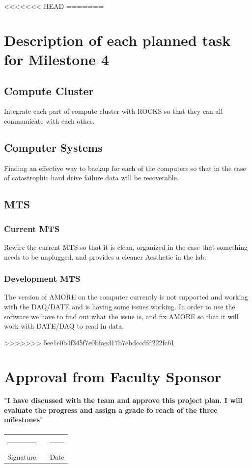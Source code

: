 \documentclass[12pt]{article}
\newcommand\tab[1][1cm]{\hspace*{#1}}
\newcommand{\doubleSignature}[2]{
	\begin{center}
		
	\end{center}
	\vspace{2cm}
	
	\noindent
	\begin{tabular}{lcl}
		\rule{7cm}{1pt} & \hspace{2cm} & \rule{3cm}{1pt} \\
		#1 & & #2
	\end{tabular}
	\vspace{1cm}
}
\begin{document}
<<<<<<< HEAD
=======
\section{Description of each planned task for Milestone 4}
\subsection{Compute Cluster}
\tab Integrate each part of compute cluster with ROCKS so that they can all communicate with each other.
\subsection{Computer Systems}
\tab Finding an effective way to backup for each of the computers so that in the case of catastrophic hard drive failure data will be recoverable. 
\subsection{MTS}
\subsubsection{Current MTS}
\tab Rewire the current MTS so that it is clean, organized in the case that something needs to be unplugged, and provides a cleaner Aesthetic in the lab. 
\subsubsection{Development MTS}
\tab The version of AMORE on the computer currently is not supported and working with the DAQ/DATE and is having some issues working. In order to use the software we have to find out what the issue is, and fix AMORE so that it will work with DATE/DAQ to read in data. 

>>>>>>> 5ee1e0b4f345f7e0bfaed17b7ebdccdfd222fc61
\section{Approval from Faculty Sponsor}
\paragraph{\tab "I have discussed with the team and approve this project plan. I will evaluate the progress and assign a grade fo reach of the three milestones"}
\doubleSignature{Signature}{Date}
\end{document}
